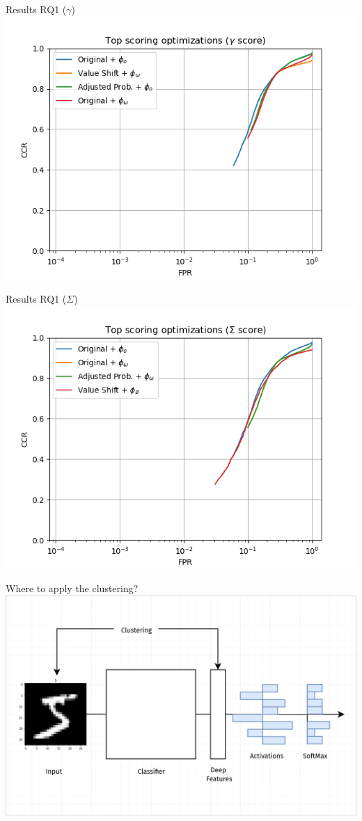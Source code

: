\begin{frame}{Results RQ1 ($\gamma$)}
	\includegraphics[width=\textwidth]{figures/Top-gamma.png}
\end{frame}

\begin{frame}{Results RQ1 ($\Sigma$)}
	\includegraphics[width=\textwidth]{figures/Top-sigma.png}
\end{frame}

\begin{frame}{Where to apply the clustering?}
	\includegraphics[width=\textwidth]{figures/openmax_clustering.png}
\end{frame}

